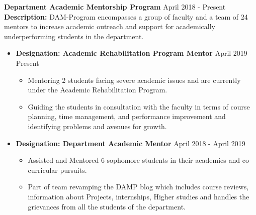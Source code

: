 
\textbf{Department Academic Mentorship Program} \hfill{April 2018 - Present}\\
\textbf{Description:} {DAM-Program encompasses a group of faculty and a team of 24 mentors to increase academic outreach and support for academically underperforming students in the department.}
\begin{itemize}
    \item{\textbf{Designation: Academic Rehabilitation Program Mentor} \hfill{April 2019 - Present}
        \begin{itemize}
            \setlength\itemsep{0.7mm}
            \item Mentoring 2 students facing severe academic issues and are currently under the Academic Rehabilitation Program.
            \item Guiding the students in consultation with the faculty in terms of course planning, time management, and performance improvement and identifying problems and avenues for growth.
        \end{itemize}}
    \item{\textbf{Designation: Department Academic Mentor} \hfill{April 2018 - April 2019}
        \begin{itemize}
            \setlength\itemsep{0.7mm}
            \item Assisted and Mentored 6 sophomore students in their academics and co-curricular pursuits.
            \item Part of team revamping the DAMP blog which includes course reviews, information about Projects, internships, Higher studies and handles the grievances from all the students of the department.
        \end{itemize}}
    
\end{itemize}{}
